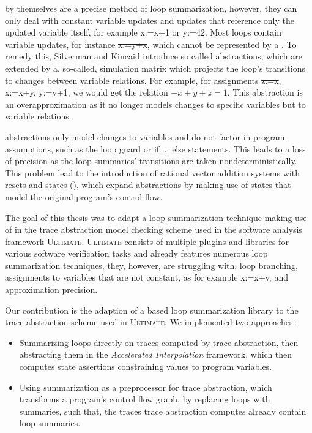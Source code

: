 \qvasr by themselves are a precise method of loop summarization, however, they can only deal with constant variable updates and updates that reference only the updated variable itself, for example \st{x:=x+1} or \st{y:=42}. Most loops contain variable updates, for instance \st{x:=y+x}, which cannot be represented by a \qvasr. To remedy this, Silverman and Kincaid introduce so called \qvasr abstractions, which are \qvasr extended by a, so-called, simulation matrix which projects the loop's transitions to changes between variable relations. For example, for assignments \st{z:=x}, \st{x:=x+y}, \st{y:=y+1}, we would get the relation $-x + y + z = 1$.
This \qvasr abstraction is an overapproximation as it no longer models changes to specific variables but to variable relations.\par
\qvasr abstractions only model changes to variables and do not factor in program assumptions, such as the loop guard or \st{if $\ldots$ else} statements. This leads to a loss of precision as the loop summaries' transitions are taken nondeterministically. This problem lead to the introduction of rational vector addition systems with resets and states (\qvasrs), which expand \qvasr abstractions by making use of states that model the original program's control flow.\par
The goal of this thesis was to adapt a loop summarization technique making use of \qvasr in the trace abstraction\cite{10.1007/978-3-642-03237-0_7} model checking scheme used in the software analysis framework \textsc{Ultimate}\cite{Zitat02}.
\textsc{Ultimate} consists of multiple plugins and libraries for various software verification tasks and already features numerous loop summarization techniques, they, however, are struggling with, loop branching, assignments to variables that are not constant, as for example \st{x:=x+y}, and approximation precision.\par
Our contribution is the adaption of a \qvasr based loop summarization library to the trace abstraction scheme used in \textsc{Ultimate}. We implemented two approaches:
\begin{itemize}
	\item Summarizing loops directly on traces computed by trace abstraction, then abstracting them in the \textsl{Accelerated Interpolation} framework, which then computes state assertions constraining values to program variables.
	\item Using \qvasr summarization as a preprocessor for trace abstraction, which transforms a program's control flow graph, by replacing loops with \qvasr summaries, such that, the traces trace abstraction computes already contain loop summaries.
\end{itemize} \par

